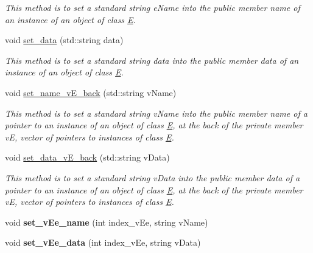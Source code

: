 \begin{DoxyCompactItemize}
\begin{DoxyCompactList}\small\item\em This method is to set a standard string e\+Name into the public member \textquotesingle{}name\textquotesingle{} of an instance of an object of class \hyperlink{classE}{E}. \end{DoxyCompactList}\item 
void \hyperlink{classE_a35efd42862ed6cfd72a3a8cf9011c707}{set\+\_\+data} (std\+::string data)
\begin{DoxyCompactList}\small\item\em This method is to set a standard string data into the public member \textquotesingle{}data\textquotesingle{} of an instance of an object of class \hyperlink{classE}{E}. \end{DoxyCompactList}\item 
void \hyperlink{classE_aa28d3672c579987f459c43c33339131b}{set\+\_\+name\+\_\+v\+E\+\_\+back} (std\+::string v\+Name)
\begin{DoxyCompactList}\small\item\em This method is to set a standard string v\+Name into the public member \textquotesingle{}name\textquotesingle{} of a pointer to an instance of an object of class \hyperlink{classE}{E}, at the back of the private member vE, vector of pointers to instances of class \hyperlink{classE}{E}. \end{DoxyCompactList}\item 
void \hyperlink{classE_afd194bd2e8b88814d8ad8c47065ee6ce}{set\+\_\+data\+\_\+v\+E\+\_\+back} (std\+::string v\+Data)
\begin{DoxyCompactList}\small\item\em This method is to set a standard string v\+Data into the public member \textquotesingle{}data\textquotesingle{} of a pointer to an instance of an object of class \hyperlink{classE}{E}, at the back of the private member vE, vector of pointers to instances of class \hyperlink{classE}{E}. \end{DoxyCompactList}\item 
void {\bfseries set\+\_\+v\+Ee\+\_\+name} (int index\+\_\+v\+Ee, string v\+Name)\hypertarget{classE_a47497b48e553fee8200d7c63a0433631}{}\label{classE_a47497b48e553fee8200d7c63a0433631}

\item 
void {\bfseries set\+\_\+v\+Ee\+\_\+data} (int index\+\_\+v\+Ee, string v\+Data)\hypertarget{classE_a563c656ec140852adc146276a90bb3fd}{}\label{classE_a563c656ec140852adc146276a90bb3fd}


\end{DoxyCompactItemize}
